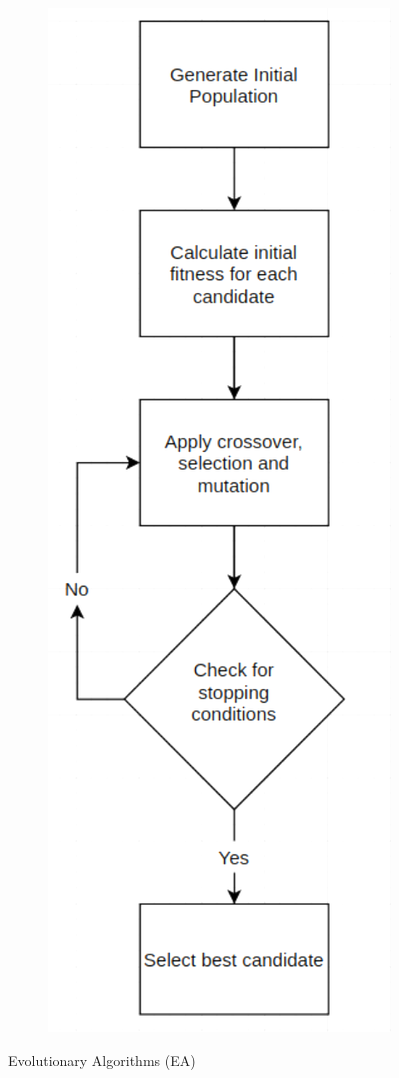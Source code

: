 \documentclass[conference]{IEEEtran}
\theoremstyle{definition}
\begin{document}
\begin{figure}[t]
	\centering
	\begin{subfigure}{.16\textwidth}
		\includegraphics[width=\textwidth]{ga.png}
		
	\end{subfigure}
	\caption{Evolutionary Algorithms (EA)}
	\label{fig:comp}
\end{figure}
\vspace{-0.1cm}
\end{document}
